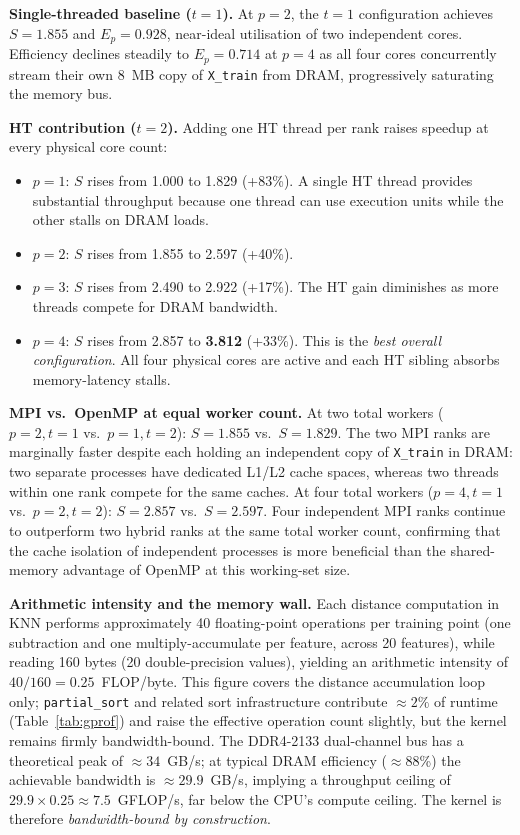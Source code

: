 \documentclass[12pt,a4paper]{article}
\begin{document}
\textbf{Single-threaded baseline ($t=1$).}
At $p=2$, the $t=1$ configuration achieves $S=1.855$ and $E_p=0.928$,
near-ideal utilisation of two independent cores. Efficiency declines steadily
to $E_p=0.714$ at $p=4$ as all four cores concurrently stream their own
8~MB copy of \texttt{X\_train} from DRAM, progressively saturating the
memory bus.

\textbf{HT contribution ($t=2$).}
Adding one HT thread per rank raises speedup at every physical core count:
\begin{itemize}
  \item $p=1$: $S$ rises from 1.000 to 1.829 (+83\%). A single HT thread
        provides substantial throughput because one thread can use execution
        units while the other stalls on DRAM loads.
  \item $p=2$: $S$ rises from 1.855 to 2.597 (+40\%).
  \item $p=3$: $S$ rises from 2.490 to 2.922 (+17\%). The HT gain diminishes
        as more threads compete for DRAM bandwidth.
  \item $p=4$: $S$ rises from 2.857 to \textbf{3.812} (+33\%). This is the
        \emph{best overall configuration}. All four physical cores are active
        and each HT sibling absorbs memory-latency stalls.
\end{itemize}

\textbf{MPI vs.\ OpenMP at equal worker count.}
At two total workers ($p=2,t=1$ vs.\ $p=1,t=2$): $S=1.855$ vs.\ $S=1.829$.
The two MPI ranks are marginally faster despite each holding an independent
copy of \texttt{X\_train} in DRAM: two separate processes have dedicated L1/L2
cache spaces, whereas two threads within one rank compete for the same caches.
At four total workers ($p=4,t=1$ vs.\ $p=2,t=2$): $S=2.857$ vs.\ $S=2.597$.
Four independent MPI ranks continue to outperform two hybrid ranks at the
same total worker count, confirming that the cache isolation of independent
processes is more beneficial than the shared-memory advantage of OpenMP at
this working-set size.

\textbf{Arithmetic intensity and the memory wall.}
Each distance computation in KNN performs approximately 40 floating-point
operations per training point (one subtraction and one multiply-accumulate
per feature, across 20 features), while reading 160 bytes (20
double-precision values), yielding an arithmetic intensity of
$40 / 160 = 0.25$~FLOP/byte. This figure covers the distance accumulation
loop only; \texttt{partial\_sort} and related sort infrastructure contribute
$\approx 2\%$ of runtime (Table~\ref{tab:gprof}) and raise the effective
operation count slightly, but the kernel remains firmly bandwidth-bound.
The DDR4-2133 dual-channel bus has a theoretical peak of $\approx 34$~GB/s;
at typical DRAM efficiency ($\approx$88\%) the achievable bandwidth is
$\approx 29.9$~GB/s, implying a throughput ceiling of
$29.9 \times 0.25 \approx 7.5$~GFLOP/s, far below the CPU's compute
ceiling. The kernel is therefore \emph{bandwidth-bound by construction}.
\end{document}
